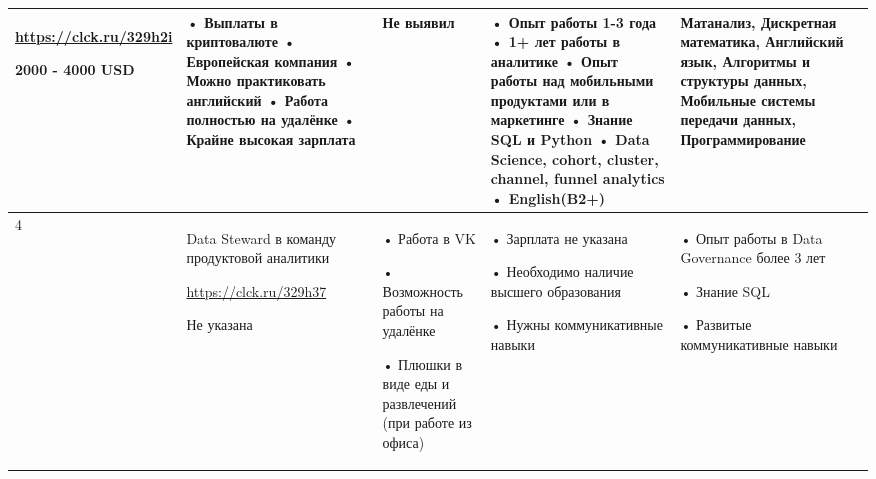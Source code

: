 \documentclass[14pt]{extreport}
\begin{document}
\begin{landscape}
\begin{table}[H]
\begin{center}
\begin{small}
\begin{tabular}{|p{0.1cm}|p{5cm}|p{4.5cm}|p{4.5cm}|p{4cm}|p{3cm}|}
				\url{https://clck.ru/329h2i}
				
				2000 - 4000 USD &
				• Выплаты в криптовалюте
				\newline• Европейская компания
				\newline• Можно практиковать английский
				\newline• Работа полностью на удалёнке
				\newline• Крайне высокая зарплата
				&
				Не выявил
				&
				• Опыт работы 1-3 года
				\newline• 1+ лет работы в аналитике
				\newline• Опыт работы над мобильными продуктами или в маркетинге
				\newline• Знание SQL и Python
				\newline• Data Science, cohort, cluster, channel, funnel analytics
				\newline• English(B2+)
				&
				Матанализ, Дискретная математика, Английский язык, Алгоритмы и структуры данных, Мобильные системы передачи данных, Программирование
				\\
				\hline
				
				4 & Data Steward в команду продуктовой аналитики
				
				\url{https://clck.ru/329h37}
				
				Не указана &
				• Работа в VK
				
				• Возможность работы на удалёнке
				
				• Плюшки в виде еды и развлечений (при работе из офиса)
				&
				• Зарплата не указана
				
				• Необходимо наличие высшего образования
				
				• Нужны коммуникативные навыки
				&
				• Опыт работы в Data Governance более 3 лет
				
				• Знание SQL
				
				• Развитые коммуникативные навыки
				

\end{tabular}
\end{small}
\end{center}
\end{table}
\end{landscape}
\end{document}
